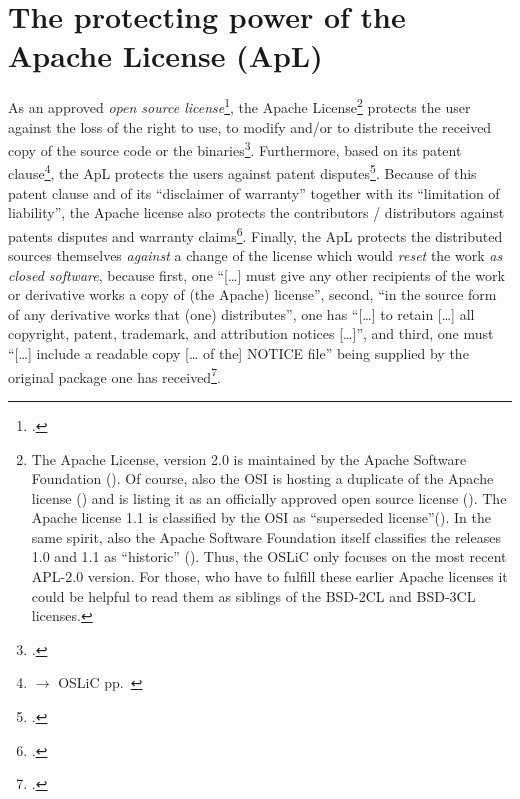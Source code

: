 \section{The protecting power of the Apache License (ApL)}
\label{sec:ProtectPowerOfApL}

As an approved \emph{open source license}\footcite[cf.][\nopage wp]{OSI2012b},
the Apache License\footnote{The Apache License, version 2.0 is maintained by the
Apache Software Foundation (\cite[cf.][\nopage wp]{AsfApacheLicense20a}).  Of
course, also the OSI is hosting a duplicate of the Apache license
(\cite[cf.][\nopage wp]{Apl20OsiLicense2004a}) and is listing it as an
officially approved open source license (\cite[cf.][\nopage wp]{OSI2012b}). The
Apache license 1.1 is classified by the OSI as \enquote{superseded
license}(\cite[cf.][\nopage wp]{OSI2013b}). In the same spirit, also the Apache
Software Foundation itself classifies the releases 1.0 and 1.1 as
\enquote{historic} (\cite[cf.][\nopage wp]{AsfLicenses2013a}). Thus, the OSLiC
only focuses on the most recent APL-2.0 version. For those, who have to fulfill
these earlier Apache licenses it could be helpful to read them as siblings of
the BSD-2CL and BSD-3CL licenses.} protects the user against the loss of the
right to use, to modify and/or to distribute the received copy of the source
code or the binaries\footcite[cf.][\nopage wp. §2]{Apl20OsiLicense2004a}.
Furthermore, based on its patent clause\footnote{$\rightarrow$ OSLiC pp.\
\pageref{subsec:ApLPatentClause}}, the ApL protects the users against patent
disputes\footcite[cf.][\nopage wp. §3]{Apl20OsiLicense2004a}. Because of this
patent clause and of its \enquote{disclaimer of warranty} together with its
\enquote{limitation of liability}, the Apache license also protects the
contributors / distributors against patents disputes and warranty
claims\footcite[cf.][\nopage wp. §3, §7, §8]{Apl20OsiLicense2004a}. Finally, the
ApL protects the distributed sources themselves \emph{against} a change of the
license which would \emph{reset} the work \emph{as closed software}, because
first, one \enquote{[\ldots] must give any other recipients of the work or
derivative works a copy of (the Apache) license}, second, \enquote{in the source
form of any derivative works that (one) distributes}, one has \enquote{[\ldots]
to retain [\ldots] all copyright, patent, trademark, and attribution notices
[\ldots]}, and third, one must \enquote{[\ldots] include a readable copy [\ldots
of the] NOTICE file} being supplied by the original package one has
received\footcite[cf.][\nopage wp. §4]{Apl20OsiLicense2004a}.

